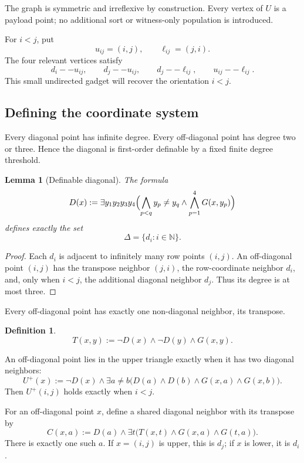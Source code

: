 \documentclass[11pt]{article}
\newtheorem{lemma}[theorem]{Lemma}
\theoremstyle{definition}
\newtheorem{definition}[theorem]{Definition}
\newcommand{\N}{\mathbb N}
\begin{document}
The graph is symmetric and irreflexive by construction.  Every vertex of $U$ is a payload point; no additional sort or witness-only population is introduced.

For $i<j$, put
\[
u_{ij}=(i,j),\qquad \ell_{ij}=(j,i).
\]
The four relevant vertices satisfy
\[
d_i--u_{ij},\qquad d_j--u_{ij},\qquad d_j--\ell_{ij},\qquad u_{ij}--\ell_{ij}.
\]
This small undirected gadget will recover the orientation $i<j$.

\subsection{Defining the coordinate system}

Every diagonal point has infinite degree.  Every off-diagonal point has degree two or three.  Hence the diagonal is first-order definable by a fixed finite degree threshold.

\begin{lemma}[Definable diagonal]\label{lem:diag}
The formula
\[
D(x):=\exists y_1y_2y_3y_4\Bigl(
\bigwedge_{p<q}y_p\ne y_q\wedge
\bigwedge_{p=1}^4G(x,y_p)
\Bigr)
\]
defines exactly the set
\[
\Delta=\{d_i:i\in\N\}.
\]
\end{lemma}

\begin{proof}
Each $d_i$ is adjacent to infinitely many row points $(i,j)$.  An off-diagonal point $(i,j)$ has the transpose neighbor $(j,i)$, the row-coordinate neighbor $d_i$, and, only when $i<j$, the additional diagonal neighbor $d_j$.  Thus its degree is at most three.
\end{proof}

Every off-diagonal point has exactly one non-diagonal neighbor, its transpose.

\begin{definition}
\[
T(x,y):=\neg D(x)\wedge\neg D(y)\wedge G(x,y).
\]
\end{definition}

An off-diagonal point lies in the upper triangle exactly when it has two diagonal neighbors:
\[
U^+(x):=\neg D(x)\wedge
\exists a\ne b\bigl(D(a)\wedge D(b)\wedge G(x,a)\wedge G(x,b)\bigr).
\]
Then $U^+(i,j)$ holds exactly when $i<j$.

For an off-diagonal point $x$, define a shared diagonal neighbor with its transpose by
\[
C(x,a):=D(a)\wedge\exists t\bigl(T(x,t)\wedge G(x,a)\wedge G(t,a)\bigr).
\]
There is exactly one such $a$.  If $x=(i,j)$ is upper, this is $d_j$; if $x$ is lower, it is $d_i$.
\end{document}
